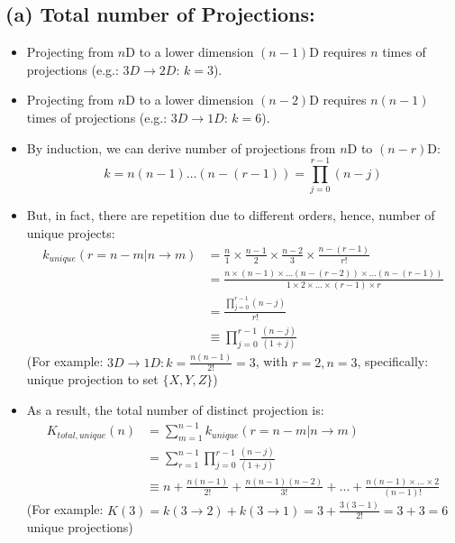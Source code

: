 \documentclass{tron}
\begin{document}
\subsection{(a) Total number of Projections:}
\begin{itemize}
	\item Projecting from $n$D to a lower dimension $(n-1)$D requires $n$ times of projections (e.g.: $3D\rightarrow2D: \,k=3$).
	\item Projecting from $n$D to a lower dimension $(n-2)$D requires $n(n-1)$ times of projections (e.g.: $3D\rightarrow1D: \,k=6$).
	\item By induction, we can derive number of projections from $n$D to $(n-r)$D:
	\begin{equation}
		k = n(n-1)\dots(n-(r-1)) = \prod_{j=0}^{r-1} (n - j)
	\end{equation}
	\item But, in fact, there are repetition due to different orders, hence, number of unique projects:
	\begin{align}
		k_{unique}(r=n-m | n\rightarrow m) &= \frac{n}{1} \times \frac{n-1}{2} \times \frac{n-2}{3} \times \frac{n - (r-1)}{r!}\\ 
			& =\frac{n\times (n-1) \times \dots(n-(r-2)) \times \dots(n-(r-1))}{1\times 2\times \dots \times (r-1) \times r} \\
			& = \frac{ \prod_{j=0}^{r-1} (n - j) }{r!} \\
			& \equiv  \prod_{j=0}^{r-1} \frac{(n - j)}{ (1 + j) }
	\end{align}
	(For example: $3D\rightarrow 1D: k = \frac{n(n-1)}{2!} = 3$, with $r=2, n=3$, specifically: unique projection to set $\{X, Y, Z\}$)
	\item As a result, the total number of distinct projection is:
	\begin{align}
		K_{total, unique}(n) &= \sum_{m=1}^{n-1} k_{unique}(r=n-m | n\rightarrow m) \\
		&= \sum_{r=1}^{n-1}  \prod_{j=0}^{r-1} \frac{(n - j)}{ (1 + j) } \\
		&\equiv n + \frac{n(n-1)}{2!} + \frac{n(n-1)(n-2)}{3!} + \dots + \frac{n(n-1)\times\dots\times2}{(n-1)!}
	\end{align}
	(For example: $K(3) = k(3\rightarrow2) + k(3\rightarrow1) = 3 + \frac{3(3-1)}{2!} = 3 + 3 = 6$ unique projections)
\end{itemize}
\end{document}
